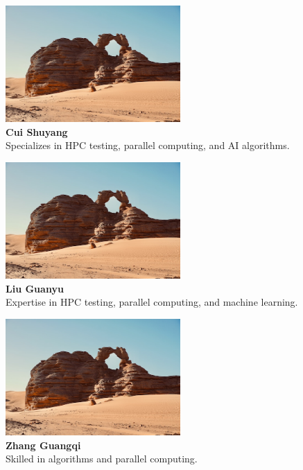 \documentclass[a4paper,12pt]{article}
\begin{document}
\begin{table}[H]
\begin{center}
\begin{minipage}{0.45\textwidth}
    \centering
    \includegraphics[width=0.5\textwidth]{Cui_Shuyang.png}\\[0.3cm]
    \textbf{Cui Shuyang}\\[0.3cm]
    \small{Specializes in HPC testing, parallel computing, and AI algorithms.}
\end{minipage}
\begin{minipage}{0.45\textwidth}
    \centering
    \includegraphics[width=0.5\textwidth]{Li_Jinze.png}\\[0.3cm]
    \textbf{Liu Guanyu}\\[0.3cm]
    \small{Expertise in HPC testing, parallel computing, and machine learning.}
\end{minipage}

\vspace{1cm}

\begin{minipage}{0.45\textwidth}
    \centering
    \includegraphics[width=0.5\textwidth]{Fang_Yi.png}\\[0.3cm]
    \textbf{Zhang Guangqi}\\[0.3cm]
    \small{Skilled in algorithms and parallel computing.}
\end{minipage}
\end{center}
\end{table}
\end{document}
